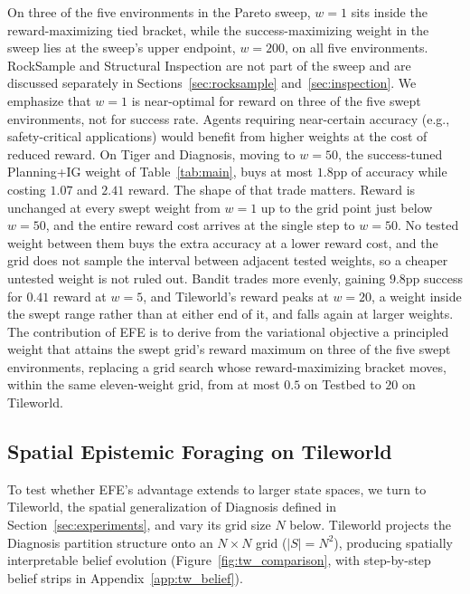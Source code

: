 On three of the five environments in the Pareto sweep, $w{=}1$ sits inside the reward-maximizing tied bracket, while the success-maximizing weight in the sweep lies at the sweep's upper endpoint, $w{=}200$, on all five environments. RockSample and Structural Inspection are not part of the sweep and are discussed separately in Sections~\ref{sec:rocksample} and~\ref{sec:inspection}. We emphasize that $w{=}1$ is near-optimal for reward on three of the five swept environments, not for success rate. Agents requiring near-certain accuracy (e.g., safety-critical applications) would benefit from higher weights at the cost of reduced reward. On Tiger and Diagnosis, moving to $w{=}50$, the success-tuned Planning+IG weight of Table~\ref{tab:main}, buys at most $1.8$pp of accuracy while costing $1.07$ and $2.41$ reward. The shape of that trade matters. Reward is unchanged at every swept weight from $w{=}1$ up to the grid point just below $w{=}50$, and the entire reward cost arrives at the single step to $w{=}50$. No tested weight between them buys the extra accuracy at a lower reward cost, and the grid does not sample the interval between adjacent tested weights, so a cheaper untested weight is not ruled out. Bandit trades more evenly, gaining $9.8$pp success for $0.41$ reward at $w{=}5$, and Tileworld's reward peaks at $w{=}20$, a weight inside the swept range rather than at either end of it, and falls again at larger weights. The contribution of EFE is to derive from the variational objective a principled weight that attains the swept grid's reward maximum on three of the five swept environments, replacing a grid search whose reward-maximizing bracket moves, within the same eleven-weight grid, from at most $0.5$ on Testbed to $20$ on Tileworld.

\subsection{Spatial Epistemic Foraging on Tileworld}
\label{app:tileworld_details}

To test whether EFE's advantage extends to larger state spaces, we turn to Tileworld, the spatial generalization of Diagnosis defined in Section~\ref{sec:experiments}, and vary its grid size $N$ below. Tileworld projects the Diagnosis partition structure onto an $N{\times}N$ grid ($|S|{=}N^2$), producing spatially interpretable belief evolution (Figure~\ref{fig:tw_comparison}, with step-by-step belief strips in Appendix~\ref{app:tw_belief}).

